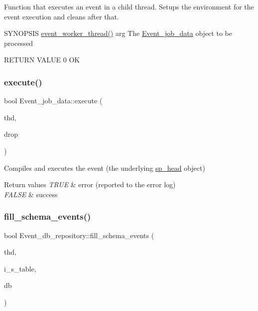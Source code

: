 Function that executes an event in a child thread. Setups the environment for the event execution and cleans after that.

S\+Y\+N\+O\+P\+S\+IS \mbox{\hyperlink{group__Event__Scheduler_ga01bf4e084293a37ca93a4ab383f72a19}{event\+\_\+worker\+\_\+thread()}} arg The \mbox{\hyperlink{classEvent__job__data}{Event\+\_\+job\+\_\+data}} object to be processed

R\+E\+T\+U\+RN V\+A\+L\+UE 0 OK \mbox{\label{group__Event__Scheduler_gaeb3f7011c6b8ec77e148d46e691011a5}} 
\subsubsection{\texorpdfstring{execute()}{execute()}}
{\footnotesize\ttfamily bool Event\+\_\+job\+\_\+data\+::execute (\begin{DoxyParamCaption}\item[{T\+HD $\ast$}]{thd,  }\item[{bool}]{drop }\end{DoxyParamCaption})}

Compiles and executes the event (the underlying \mbox{\hyperlink{classsp__head}{sp\+\_\+head}} object)


\begin{DoxyRetVals}{Return values}
{\em T\+R\+UE} & error (reported to the error log) \\
\hline
{\em F\+A\+L\+SE} & success \\
\hline
\end{DoxyRetVals}
\mbox{\label{group__Event__Scheduler_ga6fa6828fbb74522072631b6d462b6772}} 
\subsubsection{\texorpdfstring{fill\+\_\+schema\+\_\+events()}{fill\_schema\_events()}\hspace{0.1cm}{\footnotesize\ttfamily [1/2]}}
{\footnotesize\ttfamily bool Event\+\_\+db\+\_\+repository\+::fill\+\_\+schema\+\_\+events (\begin{DoxyParamCaption}\item[{T\+HD $\ast$}]{thd,  }\item[{\mbox{\hyperlink{structTABLE__LIST}{T\+A\+B\+L\+E\+\_\+\+L\+I\+ST}} $\ast$}]{i\+\_\+s\+\_\+table,  }\item[{const char $\ast$}]{db }\end{DoxyParamCaption})}

